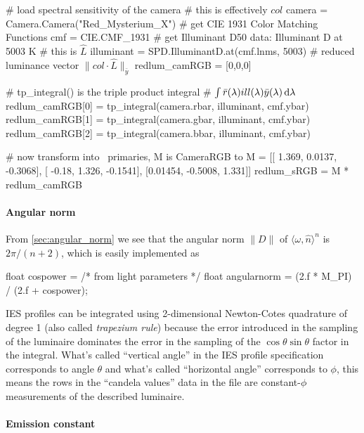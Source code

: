 \begin{pythoncode}
# load spectral sensitivity of the camera
# this is effectively $col$
camera = Camera.Camera("Red_Mysterium_X")
# get CIE 1931 Color Matching Functions
cmf = CIE.CMF_1931
# get Illuminant D50 data: Illuminant D at 5003 K
# this is $\hat{L}$
illuminant = SPD.IlluminantD.at(cmf.lnms, 5003)
# reduced luminance vector $\|col\cdot \hat{L}\|_{\bar{y}}$
redlum_camRGB = [0,0,0]

# tp\_integral() is the triple product integral
# $\int \bar{r}(\lambda) ill(\lambda) \bar{y}(\lambda) \mathop{}\!\mathrm{d}\lambda$
redlum_camRGB[0] = tp_integral(camera.rbar, illuminant, cmf.ybar)
redlum_camRGB[1] = tp_integral(camera.gbar, illuminant, cmf.ybar)
redlum_camRGB[2] = tp_integral(camera.bbar, illuminant, cmf.ybar)

# now transform into \sRGBl\ primaries, M is CameraRGB to \sRGBl
M = [[  1.369,  0.0137, -0.3068],
 [  -0.18,   1.326, -0.1541],
 [0.01454, -0.5008,   1.331]]
redlum_sRGB = M * redlum_camRGB

\end{pythoncode}


\paragraph{Angular norm}

From \cref{sec:angular_norm} we see that the angular norm $\|D\|$ of
$\langle \omega, \hat n \rangle^n$ is $2\pi / (n+2)$, which is easily
implemented as

\begin{c++code}
float cospower = /* from light parameters */
float angularnorm = (2.f * M_PI) / (2.f + cospower);
\end{c++code}

\Gls{IES} profiles can be integrated using 2-dimensional Newton-Cotes quadrature
of degree 1 (also called \textsl{trapezium rule}) because the error introduced
in the sampling of the luminaire dominates the error in the sampling of the
$\cos\theta\sin\theta$ factor in the integral. What's called ``vertical angle''
in the \gls{IES} profile specification corresponds to angle $\theta$ and what's
called ``horizontal angle'' corresponds to $\phi$, this means the rows in the
``candela values'' data in the file are constant-$\phi$ measurements of the
described luminaire.

\paragraph{Emission constant}

